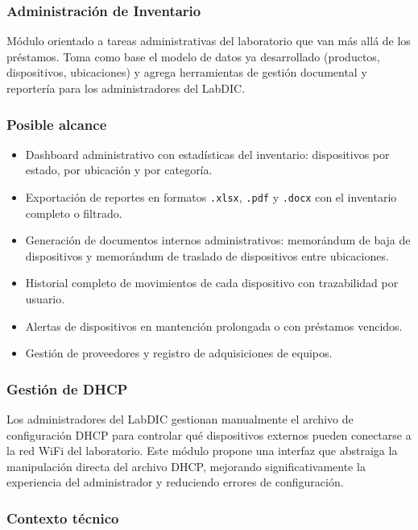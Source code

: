 \subsubsection{Administración de Inventario}

Módulo orientado a tareas administrativas del laboratorio que van más allá de los 
préstamos. Toma como base el modelo de datos ya desarrollado (productos, dispositivos, 
ubicaciones) y agrega herramientas de gestión documental y reportería para los 
administradores del LabDIC.

\subsubsection*{Posible alcance}

\begin{itemize}
	\item Dashboard administrativo con estadísticas del inventario: dispositivos por 
	estado, por ubicación y por categoría.
	\item Exportación de reportes en formatos \texttt{.xlsx}, \texttt{.pdf} y 
	\texttt{.docx} con el inventario completo o filtrado.
	\item Generación de documentos internos administrativos: memorándum de baja de 
	dispositivos y memorándum de traslado de dispositivos entre ubicaciones.
	\item Historial completo de movimientos de cada dispositivo con trazabilidad por 
	usuario.
	\item Alertas de dispositivos en mantención prolongada o con préstamos vencidos.
	\item Gestión de proveedores y registro de adquisiciones de equipos.
\end{itemize}

\subsubsection{Gestión de DHCP}

Los administradores del LabDIC gestionan manualmente el archivo de configuración DHCP 
para controlar qué dispositivos externos pueden conectarse a la red WiFi del 
laboratorio. Este módulo propone una interfaz que abstraiga la manipulación directa 
del archivo DHCP, mejorando significativamente la experiencia del administrador y 
reduciendo errores de configuración.

\subsubsection*{Contexto técnico}

